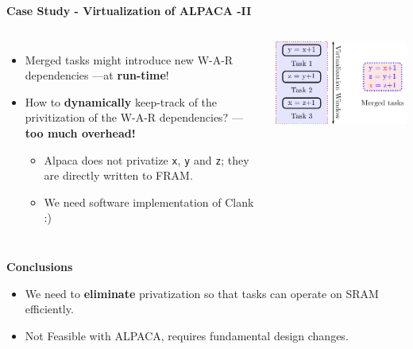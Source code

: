 

\begin{frame}{\textbf{Case Study - Virtualization of ALPACA -II}}
	
	\begin{columns}		
	
	\begin{itemize}
		\item Merged tasks might introduce new W-A-R dependencies ---at \textbf{run-time}!
		\item How to \textbf{dynamically} keep-track of the privitization of the W-A-R dependencies? ---\textbf{too much overhead!}
		\begin{itemize}
			\item Alpaca does not privatize \texttt{x}, \texttt{y} and \texttt{z}; they are directly written to FRAM. 
			\item We need software implementation of Clank :)
		\end{itemize}
	\end{itemize}
	
	\includegraphics[scale=0.7]{images/alpaca-war.pdf}
\end{columns}	

\begin{alertblock}{\textbf{Conclusions}}
	\begin{itemize}
		\item We need to \textbf{eliminate} privatization so that tasks can operate on SRAM efficiently.
		\item Not Feasible with ALPACA, requires fundamental design changes.
	\end{itemize}	
\end{alertblock}
	
\end{frame}

